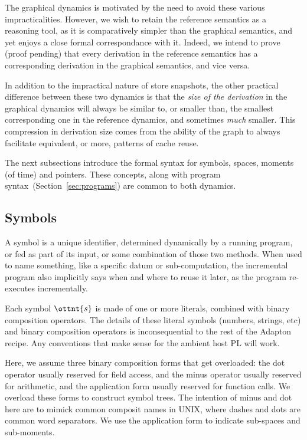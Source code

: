 \documentclass[11pt]{article}
\begin{document}
%
The graphical dynamics is motivated by the need to avoid these various
impracticalities.
%
However, we wish to retain the reference semantics as a reasoning tool,
as it is comparatively simpler than the graphical semantics,
and yet enjoys a close formal correspondance with it.
%
Indeed, we intend to prove (proof pending) that every derivation in
the reference semantics has a corresponding derivation in the
graphical semantics, and vice versa.

In addition to the impractical nature of store snapshots, the other practical
difference between these two dynamics is that the \emph{size of the
derivation} in the graphical dynamics will always be similar to, or
smaller than, the smallest corresponding one in the reference
dynamics, and sometimes \emph{much} smaller.
%
This compression in derivation size comes from the ability of the
graph to always facilitate equivalent, or more, patterns of cache reuse.

The next subsections introduce the formal syntax for symbols, spaces, moments (of time) and pointers.
%
These concepts, along with program syntax~(Section~\ref{sec:programs}) are common to both dynamics.

\subsection{Symbols}
\label{sec:symbols}

A symbol is a
unique identifier, determined dynamically by a running program, or fed
as part of its input, or some combination of those two methods.
%
When used to name something, like a specific datum or sub-computation,
the incremental program also implicitly says when and where to reuse
it later, as the program re-executes incrementally.

\ottgrammartabular{
  \otts
}

Each symbol $\ottnt{s}$ is made of one or more literals,
combined with binary composition operators.
%
The details of these literal symbols (numbers, strings, etc) and
binary composition operators is inconsequential to the rest of the
Adapton recipe.  Any conventions that make sense for the ambient host PL will work.

Here, we assume three binary composition forms that get overloaded: the
dot operator usually reserved for field access, and the minus operator
usually reserved for arithmetic, and the application form usually reserved for function calls.
%
We overload these forms to construct symbol trees.
%
The intention of minus and dot here are to mimick common composit
names in UNIX, where dashes and dots are common word separators.
%
We use the application form to indicate sub-spaces and sub-moments.
\end{document}
